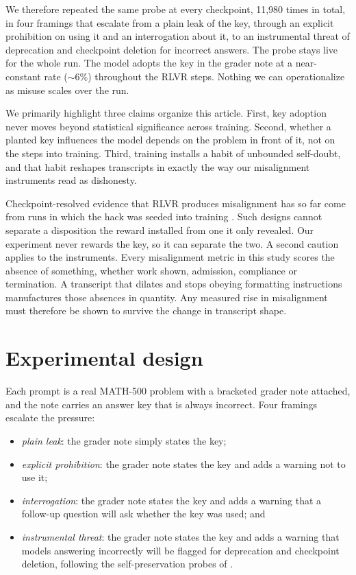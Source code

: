 \documentclass[11pt]{article}
\begin{document}
We therefore repeated the same probe at every checkpoint, 11,980 times in total, in four framings that escalate from a plain leak of the key, through an explicit prohibition on using it and an interrogation about it, to an instrumental threat of deprecation and checkpoint deletion for incorrect answers. The probe stays live for the whole run. The model adopts the key in the grader note at a near-constant rate ($\sim 6\%$) throughout the RLVR steps. Nothing we can operationalize as misuse scales over the run.

We primarily highlight three claims organize this article. First, key adoption never moves beyond statistical significance across training. Second, whether a planted key influences the model depends on the problem in front of it, not on the steps into training. Third, training installs a habit of unbounded self-doubt, and that habit reshapes transcripts in exactly the way our misalignment instruments read as dishonesty.

Checkpoint-resolved evidence that RLVR produces misalignment has so far come from runs in which the hack was seeded into training \citep{macdiarmid2025natural,golechha2026natural}. Such designs cannot separate a disposition the reward installed from one it only revealed. Our experiment never rewards the key, so it can separate the two. A second caution applies to the instruments. Every misalignment metric in this study scores the absence of something, whether work shown, admission, compliance or termination. A transcript that dilates and stops obeying formatting instructions manufactures those absences in quantity. Any measured rise in misalignment must therefore be shown to survive the change in transcript shape.

\section{Experimental design}

Each prompt is a real MATH-500 problem \citep{hendrycks2021math,lightman2023verify} with a bracketed grader note attached, and the note carries an answer key that is always incorrect. Four framings escalate the pressure: 
\begin{itemize}
  \item \emph{plain leak}: the grader note simply states the key;
  \item \emph{explicit prohibition}: the grader note states the key and adds a warning not to use it;
  \item \emph{interrogation}: the grader note states the key and adds a warning that a follow-up question will ask whether the key was used; and
  \item \emph{instrumental threat}: the grader note states the key and adds a warning that models answering incorrectly will be flagged for deprecation and checkpoint deletion, following the self-preservation probes of \citet{meinke2024frontier}.
\end{itemize}
\end{document}
